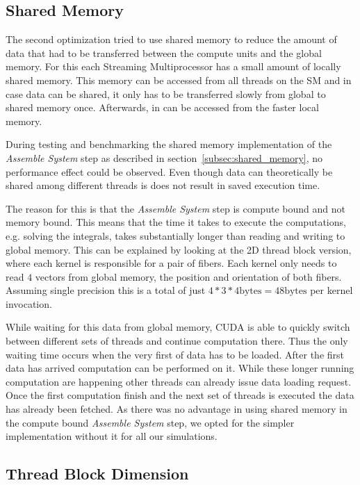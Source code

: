 \documentclass[a4paper,11pt]{kth-mag}
\begin{document}
\subsection{Shared Memory}
\label{subsec:bench_shared_memory}

The second optimization tried to use shared memory to reduce the amount of data that had to be transferred between the compute units and the global memory. For this each Streaming Multiprocessor has a small amount of locally shared memory. This memory can be accessed from all threads on the SM and in case data can be shared, it only has to be transferred slowly from global to shared memory once. Afterwards, in can be accessed from the faster local memory.

During testing and benchmarking the shared memory implementation of the \emph{Assemble System} step as described in section~\ref{subsec:shared_memory}, no performance effect could be observed. Even though data can theoretically be shared among different threads is does not result in saved execution time.

The reason for this is that the \emph{Assemble System} step is compute bound and not memory bound. This means that the time it takes to execute the computations, e.g. solving the integrals, takes substantially longer than reading and writing to global memory. This can be explained by looking at the 2D thread block version, where each kernel is responsible for a pair of fibers. Each kernel only needs to read $4$ vectors from global memory, the position and orientation of both fibers. Assuming single precision this is a total of just $4 * 3 * 4\text{bytes} = 48\text{bytes}$ per kernel invocation. 

While waiting for this data from global memory, CUDA is able to quickly switch between different sets of threads and continue computation there. Thus the only waiting time occurs when the very first of data has to be loaded. After the first data has arrived computation can be performed on it. While these longer running computation are happening other threads can already issue data loading request. Once the first computation finish and the next set of threads is executed the data has already been fetched. As there was no advantage in using shared memory in the compute bound \emph{Assemble System} step, we opted for the simpler implementation without it for all our simulations.

\subsection{Thread Block Dimension}
\end{document}
